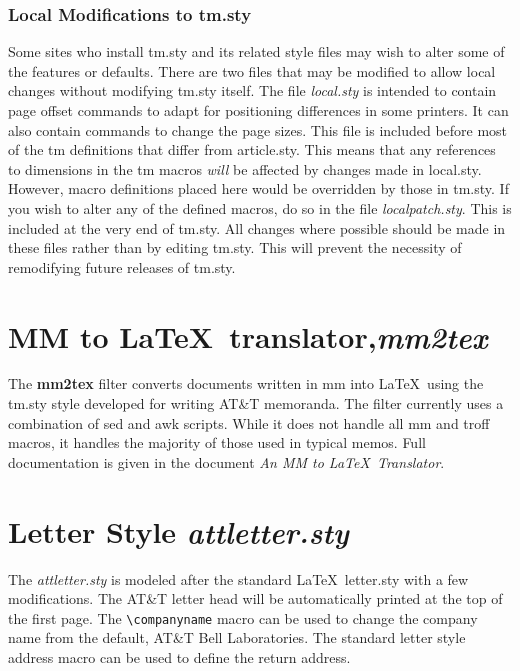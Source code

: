\section{Local Modifications to tm.sty}
Some sites who install tm.sty and its related style files may wish to
alter some of the features or defaults.  There are two files that may
be modified to allow local changes without modifying tm.sty itself.
The file {\it local.sty} is intended to contain page offset commands
to adapt for positioning differences in some printers.  It can also
contain commands to change the page sizes.  This file is included
before most of the tm definitions that differ from article.sty.  This
means that any references to dimensions in the tm macros {\it will} be
affected by changes made in local.sty.  However, macro definitions
placed here would be overridden by those in tm.sty.  If you wish to
alter any of the defined macros, do so in the file {\it localpatch.sty}.
This is included at the very end of tm.sty.  All changes where
possible should be made in these files rather than by editing tm.sty.
This will prevent the necessity of remodifying future releases of tm.sty.

\part{MM to \LaTeX\ translator,{\it mm2tex}}

The {\bf mm2tex} filter converts documents written in mm into \LaTeX\ using
the tm.sty style developed for writing AT\&T memoranda.  The filter
currently uses a combination of sed and awk scripts.  While it does
not handle all mm and troff macros, it handles the majority of those
used in typical memos.  Full documentation is given in the document
{\it An MM to \LaTeX\ Translator}.\cite{bib:mm2tex}

\part{Letter Style {\it attletter.sty}}
The {\it attletter.sty} is modeled after the standard \LaTeX\
letter.sty with a few modifications.  The AT\&T letter head will be
automatically printed at the top of the first page.  The
\verb|\companyname| macro can be used to change the company name from
the default, AT\&T Bell Laboratories.  The standard letter style
address macro can be used to define the return address.  

